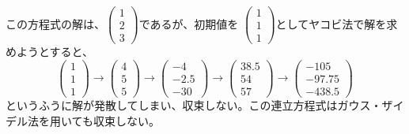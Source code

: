 \documentclass[titlepage]{jsarticle}
\begin{document}
	この方程式の解は、$\left(
	                \begin{array}{c}
	                    1 \\
	                    2 \\
	                    3
	                \end{array}
	            \right)$であるが、初期値を
			$\left(
	                \begin{array}{c}
	                    1 \\
	                    1 \\
	                    1
	                \end{array}
	            \right)$としてヤコビ法で解を求めようとすると、
			\begin{equation*}
	            \left(
	                \begin{array}{c}
	                    1 \\
	                    1 \\
	                    1
	                \end{array}
	            \right) \rightarrow \left(
	                \begin{array}{c}
	                    4 \\
	                    5 \\
	                    5
	                \end{array}
	            \right) \rightarrow \left(
	                \begin{array}{c}
	                    -4 \\
	                    -2.5 \\
	                    -30
	                \end{array}
	            \right)\rightarrow \left(
	                \begin{array}{c}
	                    38.5 \\
	                    54 \\
	                    57
	                \end{array}
	            \right)\rightarrow \left(
	                \begin{array}{c}
	                    -105 \\
	                    -97.75 \\
	                    -438.5
	                \end{array}
	            \right)
       	 \end{equation*}
		というふうに解が発散してしまい、収束しない。この連立方程式はガウス・ザイデル法を用いても収束しない。
\end{document}
